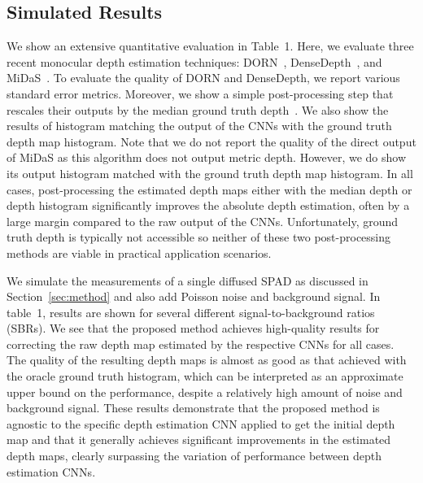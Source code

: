 \subsection{Simulated Results}

We show an extensive quantitative evaluation in Table~1. Here, we evaluate three recent monocular depth estimation techniques: DORN~\cite{Fu2018}, DenseDepth~\cite{Alhashim2018}, and MiDaS~\cite{Lasinger:2019}. To evaluate the quality of DORN and DenseDepth, we report various standard error metrics. Moreover, we show a simple post-processing step that rescales their outputs by the median ground truth depth~\cite{Alhashim2018}. We also show the results of histogram matching the output of the CNNs with the ground truth depth map histogram. Note that we do not report the quality of the direct output of MiDaS as this algorithm does not output metric depth. However, we do show its output histogram matched with the ground truth depth map histogram. In all cases, post-processing the estimated depth maps either with the median depth or depth histogram significantly improves the absolute depth estimation, often by a large margin compared to the raw output of the CNNs. Unfortunately, ground truth depth is typically not accessible so neither of these two post-processing methods are viable in practical application scenarios. 

We simulate the measurements of a single diffused SPAD as discussed in Section~\ref{sec:method} and also add Poisson noise and background signal. In table~1, results are shown for several different signal-to-background ratios (SBRs). We see that the proposed method achieves high-quality results for correcting the raw depth map estimated by the respective CNNs for all cases. The quality of the resulting depth maps is almost as good as that achieved with the oracle ground truth histogram, which can be interpreted as an approximate upper bound on the performance, despite a relatively high amount of noise and background signal. These results demonstrate that the proposed method is agnostic to the specific depth estimation CNN applied to get the initial depth map and that it generally achieves significant improvements in the estimated depth maps, clearly surpassing the variation of performance between depth estimation CNNs.


